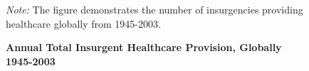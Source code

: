 \documentclass[12pt, letterpaper]{article}
\begin{document}
\newpage
\begin{center}
\begin{figure}[h!]
\renewcommand\thefigure{A.\arabic{figure}}
\begin{center}
\caption{\textbf{Annual Total Insurgent Healthcare Provision, Globally 1945-2003}}
\label{insurgenthealthany}
\renewcommand\thefigure{\Roman{figure}}
\end{center}
\begin{tablenotes}
\raggedright \footnotesize{\textit{Note:} \footnotesize The figure demonstrates the number of insurgencies providing healthcare globally from 1945-2003.} 
\end{tablenotes}
\end{figure}
\end{center}
\end{document}
